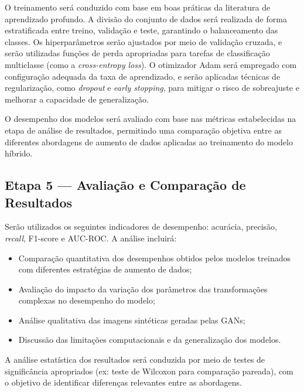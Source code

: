 O treinamento será conduzido com base em boas práticas da literatura de aprendizado profundo. A divisão do conjunto de dados será realizada de forma estratificada entre treino, validação e teste, garantindo o balanceamento das classes. Os hiperparâmetros serão ajustados por meio de validação cruzada, e serão utilizadas funções de perda apropriadas para tarefas de classificação multiclasse (como a \textit{cross-entropy loss}). O otimizador Adam será empregado com configuração adequada da taxa de aprendizado, e serão aplicadas técnicas de regularização, como \textit{dropout} e \textit{early stopping}, para mitigar o risco de sobreajuste e melhorar a capacidade de generalização.

O desempenho dos modelos será avaliado com base nas métricas estabelecidas na etapa de análise de resultados, permitindo uma comparação objetiva entre as diferentes abordagens de aumento de dados aplicadas ao treinamento do modelo híbrido.


\subsection{Etapa 5 — Avaliação e Comparação de Resultados}

Serão utilizados os seguintes indicadores de desempenho: acurácia, precisão, \textit{recall}, F1-score e AUC-ROC.
A análise incluirá:

\begin{itemize}
    
    \item Comparação quantitativa dos desempenhos obtidos pelos modelos treinados com diferentes estratégias de aumento de dados;

    \item Avaliação do impacto da variação dos parâmetros das transformações complexas no desempenho do modelo;

    \item Análise qualitativa das imagens sintéticas geradas pelas GANs;

    \item Discussão das limitações computacionais e da generalização dos modelos.

\end{itemize}

A análise estatística dos resultados será conduzida por meio de testes de significância apropriados (ex: teste de Wilcoxon para comparação pareada), com o objetivo de identificar diferenças relevantes entre as abordagens.